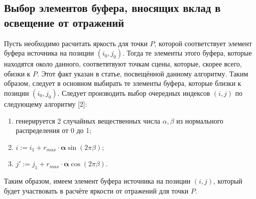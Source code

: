 {{        \subsection{Выбор элементов буфера, вносящих вклад в освещение от отражений} {
            Пусть необходимо расчитать яркость для точки $P$, которой соответствует
            элемент буфера источника на позиции $(i_0, j_0)$.
            Тогда те элементы этого буфера, которые находятся около данного,
            соответвтвуют точкам сцены, которые, скорее всего, обизки к $P$.
            Этот факт указан в статье, посвещённой данному алгоритму.
            Таким образом, следует в основном выбирать те элементы буфера,
            которые близки к позиции $(i_0, j_0)$.
            Следует производить выбор очередных индексов $(i, j)$
            по следующему алгоритму [2]:
            \begin{enumerate}
                \item
                    генерируется 2 случайных вещественных числа
                    $\alpha, \beta$ из нормального распределения от 0 до 1;
                \item $i := i_1 + r_{max} \cdot \mathbf{\alpha} \sin(2\pi\beta)$;
                \item $j' := j_1 + r_{max} \cdot \mathbf{\alpha} \cos(2\pi\beta)$.
            \end{enumerate}
            Таким образом, имеем элемент буфера источника на позиции $(i, j)$,
            который будет участвовать в расчёте яркости от отражений для точки $P$.
        }
    }
}